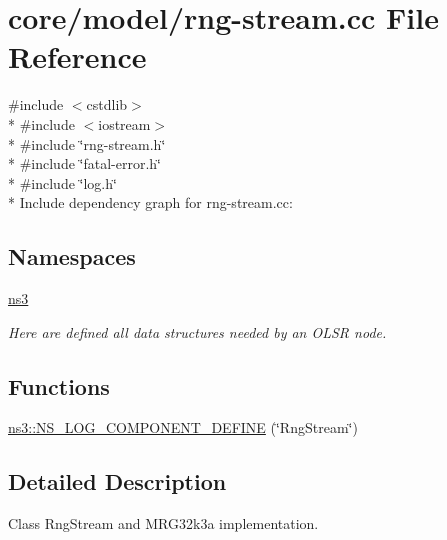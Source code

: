 \hypertarget{rng-stream_8cc}{}\section{core/model/rng-\/stream.cc File Reference}
\label{rng-stream_8cc}
{\ttfamily \#include $<$cstdlib$>$}\\*
{\ttfamily \#include $<$iostream$>$}\\*
{\ttfamily \#include \char`\"{}rng-\/stream.\+h\char`\"{}}\\*
{\ttfamily \#include \char`\"{}fatal-\/error.\+h\char`\"{}}\\*
{\ttfamily \#include \char`\"{}log.\+h\char`\"{}}\\*
Include dependency graph for rng-\/stream.cc\+:
\subsection*{Namespaces}
\begin{DoxyCompactItemize}
\item 
 \hyperlink{namespacens3}{ns3}
\begin{DoxyCompactList}\small\item\em Here are defined all data structures needed by an O\+L\+SR node. \end{DoxyCompactList}\end{DoxyCompactItemize}
\subsection*{Functions}
\begin{DoxyCompactItemize}
\item 
\hyperlink{namespacens3_aab654e4801fd1f747286c0341c4c0243}{ns3\+::\+N\+S\+\_\+\+L\+O\+G\+\_\+\+C\+O\+M\+P\+O\+N\+E\+N\+T\+\_\+\+D\+E\+F\+I\+NE} (\char`\"{}Rng\+Stream\char`\"{})
\end{DoxyCompactItemize}


\subsection{Detailed Description}
Class Rng\+Stream and M\+R\+G32k3a implementation. 